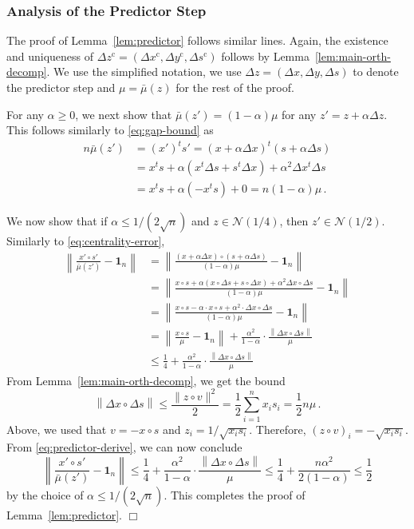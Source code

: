 \documentclass[12pt, showidx, twoside]{article}
\def\endproof{\hfill{$\Box$}}
\def\N{\mathbb{N}}
\def\gap{\bar{\mu}}
\def\bo{\mathbf{1}}
\def\N{\mathcal{N}}
\def\co{^\mathrm{c}}
\begin{document}
{{{\subsubsection{Analysis of the Predictor Step}
The proof of Lemma~\ref{lem:predictor} follows similar lines. Again, the existence and uniqueness of
$\Delta z\co=(\Delta x\co,\Delta y\co,\Delta s\co)$ follows by
Lemma~\ref{lem:main-orth-decomp}. We use the simplified notation, we use $\Delta z=(\Delta x,\Delta y,\Delta s)$ to denote the predictor step and $\mu=\gap(z)$ for the rest of the proof.

For any $\alpha\ge 0$, we next show that $\gap(z')=(1-\alpha)\mu$ for any  $z'=z+\alpha\Delta z$.
This follows similarly to \eqref{eq:gap-bound} as
\begin{equation}
\begin{aligned}
n\gap(z')&=(x')^t s'=(x+\alpha\Delta x)^t (s+\alpha\Delta s)\\
&=x^t s+\alpha\left(x^t\Delta s+s^t\Delta x\right)+\alpha^2\Delta x^t \Delta s\\
&=x^t s+ \alpha(-x^t s )+0=n(1-\alpha)\mu\, .
\end{aligned}
\end{equation}

We now show that if $\alpha\le 1/(2\sqrt{n})$ and
 $z\in\N(1/4)$, then $z'\in\N(1/2)$. Similarly to \eqref{eq:centrality-error},
\begin{equation}\label{eq:predictor-derive}
\begin{aligned}
\left\|\frac{x'\circ s'}{\gap(z')}- \bo_n\right\|&=\left\|\frac{(x+\alpha\Delta x)\circ (s+\alpha\Delta s)}{(1-\alpha)\mu}- \bo_n\right\|\\
&=\left\|\frac{x\circ s+\alpha(x\circ\Delta s+s\circ\Delta x)+\alpha^2\Delta x\circ \Delta s}{(1-\alpha)\mu}- \bo_n\right\|\\
&=\left\|\frac{x\circ s-\alpha\cdot x\circ s+\alpha^2\cdot\Delta x\circ \Delta s}{(1-\alpha)\mu}- \bo_n\right\|\\
&=\left\|\frac{x\circ s}{\mu}- \bo_n\right\|+
\frac{\alpha^2}{1-\alpha}\cdot\frac{\left\|\Delta x\circ \Delta s\right\|}{\mu}\, \\ 
&\le\frac{1}{4}+
\frac{\alpha^2}{1-\alpha}\cdot\frac{\left\|\Delta x\circ \Delta s\right\|}{\mu}\, 
\end{aligned}
\end{equation}
From Lemma~\ref{lem:main-orth-decomp}, we get the bound 
\[
    \left\|\Delta x\circ \Delta s\right\|\le \frac{\|z\circ v\|^2}{2}=\frac{1}{2}\sum_{i=1}^n x_is_i=\frac{1}{2}n\mu\, .
\]
Above, we used that  $v=-x\circ s$ and $z_{i}=1/\sqrt{x_is_i}$. Therefore,  $(z\circ v)_i=-\sqrt{x_is_i}$.
From \eqref{eq:predictor-derive}, we can now conclude
\[
\left\|\frac{x'\circ s'}{\gap(z')}- \bo_n\right\|\le \frac{1}{4}+\frac{\alpha^2}{1-\alpha}\cdot\frac{\left\|\Delta x\circ \Delta s\right\|}{\mu}\le \frac{1}{4}+\frac{n\alpha^2}{2(1-\alpha)}\le \frac{1}{2}
\]
by the choice of $\alpha\le 1/(2\sqrt{n})$. This completes the proof of Lemma~\ref{lem:predictor}.
\endproof


}}}
\end{document}

